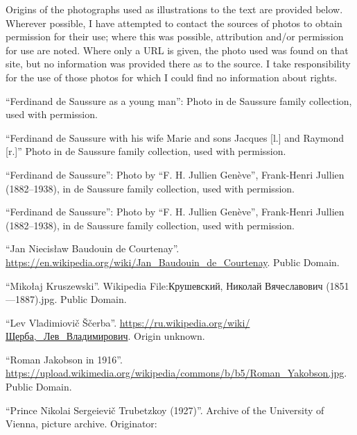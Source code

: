 
Origins of the photographs used as illustrations to the text are
provided below. Wherever possible, I have attempted to contact the
sources of photos to obtain permission for their use; where this was 
possible, attribution and/or permission for use
are noted.  Where only a URL
is given, the photo used was found on that site, but no information
was provided there as to the source. I take responsibility for the use
of those photos for which I could find no information about rights.

\begin{description}
\raggedright
\item[Figure~\ref{fig:ch.saussure_life.young_saussure}] ``Ferdinand de
  Saussure as a young man'': Photo in de Saussure family collection,
  used with permission. 
\item[Figure~\ref{fig:ch.saussure_life.saussure_family}] ``Ferdinand
  de Saussure with his wife Marie and sons Jacques [l.]  and Raymond
  [r.]'' Photo in de Saussure family collection, used with permission.
\item[Figure~\ref{fig:ch.saussure_sound.saussure}] ``Ferdinand de
  Saussure'': Photo by ``F. H. Jullien Genève'', Frank-Henri Jullien
  (1882–1938), in de Saussure family collection, used with permission.
\item[Figure~\ref{fig:ch.saussure_sound.saussure_2}] ``Ferdinand de
  Saussure'': Photo by ``F. H. Jullien Genève'', Frank-Henri Jullien
  (1882–1938), in de Saussure family collection, used with permission.
\item[Figure~\ref{fig:ch.kazan_baudouin}] ``Jan Niecisław Baudouin de
  Courtenay''.
  \url{https://en.wikipedia.org/wiki/Jan_Baudouin_de_Courtenay}. Public
  Domain.
\item[Figure\ref{fig:ch.kazan_kruszewski}] ``Mikołaj Kruszewski''.
  Wikipedia File:Крушевский, Николай Вячеславович
  (1851—1887).jpg. Public Domain.
\item[Figure~\ref{fig:ch.kazan_scerba}] ``Lev Vladimiovič Ščerba''.
  \url{https://ru.wikipedia.org/wiki/Щерба,_Лев_Владимирович}. Origin
  unknown.
\item[Figure~\ref{fig:ch.prague_jakobson_1916}] ``Roman Jakobson in
  1916''.
  \url{https://upload.wikimedia.org/wikipedia/commons/b/b5/Roman_Yakobson.jpg}.
  Public Domain.
\item[Figure~\ref{fig:ch.prague_trubetzkoy_younger}] ``Prince Nikolai
  Sergeievič Trubetzkoy (1927)''. 
  Archive of the University of Vienna, picture archive. Originator:

\end{description}
